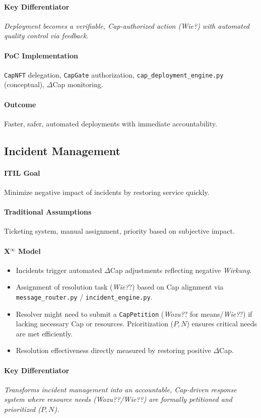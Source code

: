 \documentclass[12pt, a4paper]{scrartcl}
\newcommand{\Xinf}{X$^\infty$}                        %
\newcommand{\DeltaCap}{$\Delta$Cap}                    %
\newcommand{\Wirkung}{\textit{Wirkung}}                 %
\newcommand{\CapNFT}{\texttt{CapNFT}}
\newcommand{\CapGate}{\texttt{CapGate}}
\newcommand{\CapPetition}{\texttt{CapPetition}}        %
\newcommand{\Wozu}{\textit{Wozu?}}                      %
\newcommand{\Wie}{\textit{Wie?}}                        %
\begin{document}
\paragraph{Key Differentiator} \textit{Deployment becomes a verifiable, Cap-authorized action (\Wie{}) with automated quality control via feedback.}
\paragraph{PoC Implementation} \CapNFT{} delegation, \CapGate{} authorization, \texttt{cap\_deployment\_engine.py} (conceptual), \DeltaCap{} monitoring.
\paragraph{Outcome} Faster, safer, automated deployments with immediate accountability.

\subsection{Incident Management} %
\paragraph{ITIL Goal} Minimize negative impact of incidents by restoring service quickly.
\paragraph{Traditional Assumptions} Ticketing system, manual assignment, priority based on subjective impact.
\paragraph*{\Xinf{} Model}
\begin{itemize}
    \item Incidents trigger automated \DeltaCap{} adjustments reflecting negative \Wirkung{}.
    \item Assignment of resolution task (\Wie?) based on Cap alignment via \texttt{message\_router.py} / \texttt{incident\_engine.py}.
    \item Resolver might need to submit a \CapPetition{} (\Wozu? for means/\Wie?) if lacking necessary Cap or resources. Prioritization ($P, N$) ensures critical needs are met efficiently.
    \item Resolution effectiveness directly measured by restoring positive \DeltaCap{}.
\end{itemize}
\paragraph{Key Differentiator} \textit{Transforms incident management into an accountable, Cap-driven response system where resource needs (\Wozu?/\Wie?) are formally petitioned and prioritized ($P,N$).}
\end{document}

